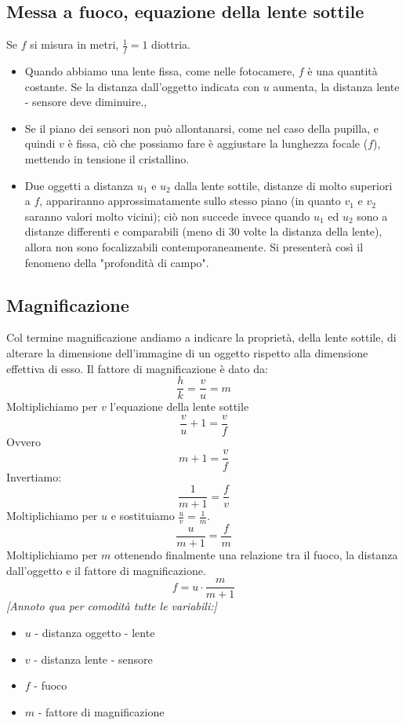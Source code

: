 \documentclass{report}
\begin{document}
	\subsection{Messa a fuoco, equazione della lente sottile}
	Se $f$ si misura in metri, $\frac{1}{f} = 1$ diottria.
	\begin{itemize}
		\item Quando abbiamo una lente fissa, come nelle fotocamere, $f$ è una quantità costante. Se la distanza dall'oggetto indicata con $u$ aumenta, la distanza lente -  sensore deve diminuire., 
		\item Se il piano dei sensori non può allontanarsi, come nel caso della pupilla, e quindi $v$ è fissa, ciò che possiamo fare è aggiustare la lunghezza focale ($f$), mettendo in tensione il cristallino. 
		\item Due oggetti a distanza $u_1$ e $u_2$ dalla lente sottile, distanze di molto superiori a $f$, appariranno approssimatamente sullo stesso piano (in quanto $v_1$ e $v_2$ saranno valori molto vicini);
		      ciò non succede invece quando $u_1$ ed $u_2$ sono a distanze differenti e comparabili (meno di 30 volte la distanza della lente), allora non sono focalizzabili contemporaneamente. Si presenterà così il fenomeno della "profondità di campo".
	\end{itemize}
	\subsection{Magnificazione}
	Col termine magnificazione andiamo a indicare la proprietà, della lente sottile, di alterare la dimensione dell'immagine di un oggetto rispetto alla dimensione effettiva di esso.
	Il fattore di magnificazione è dato da: $$\frac{h}{k} = \frac{v}{u} = m$$
	Moltiplichiamo per $v$ l'equazione della lente sottile
	$$
	\frac{v}{u} + 1 = \frac{v}{f}
	$$
	Ovvero
	$$
	m + 1 = \frac{v}{f}
	$$
	Invertiamo:
	$$
	\frac{1}{m+1} = \frac{f}{v}
	$$
	Moltiplichiamo per $u$ e sostituiamo $\frac{u}{v} = \frac{1}{m}$.
	$$
	\frac{u}{m+1} = \frac{f}{m}
	$$
	Moltiplichiamo per $m$ ottenendo finalmente una relazione tra il fuoco, la distanza dall'oggetto e il fattore di magnificazione.
	$$
	f = u \cdot \frac{m}{m+1}
	$$
	\textit{[Annoto qua per comodità tutte le variabili:]}
	\begin{itemize}
		\item $u$ - distanza oggetto - lente
		\item $v$ - distanza lente - sensore
		\item $f$ - fuoco
		\item $m$ - fattore di magnificazione
	\end{itemize}
	
\end{document}
